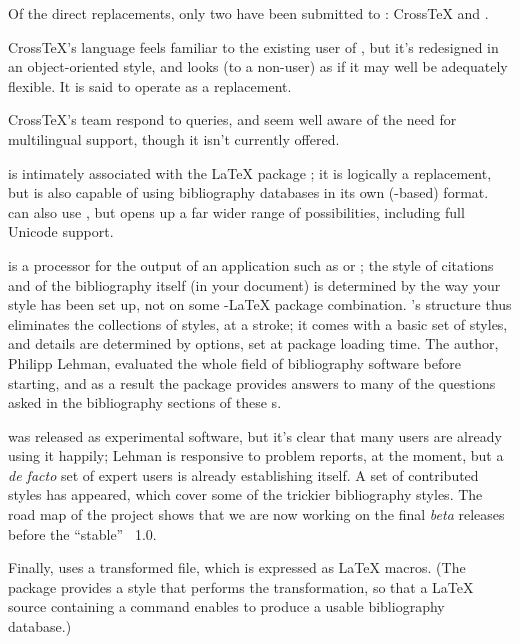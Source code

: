 Of the direct \BibTeX{} replacements, only two have been submitted to
: Cross\TeX{} and .

Cross\TeX{}'s language feels familiar to the existing user of
\BibTeX{}, but it's redesigned in an object-oriented style, and looks
(to a non-user) as if it may well be adequately flexible.  It is said
to operate as a \BibTeX{} replacement.

Cross\TeX{}'s team respond to queries, and seem well aware of the
need for multilingual support, though it isn't currently offered.

 is intimately associated with the \LaTeX{} package
; it is logically a \BibTeX{} replacement, but is also
capable of using bibliography databases in its own
 (-based) format.  
can also use \BibTeX{}, but  opens up a far wider
range of possibilities, including full Unicode support.

 is a processor for the output of an application
such as  or \BibTeX{}; the style of citations and of
the bibliography itself (in your document) is determined by the way
your  style has been set up, not on some
\BibTeX{}-\LaTeX{} package combination.  's
structure thus eliminates the collections of \BibTeX{} styles, at a
stroke; it comes with a basic set of styles, and details are
determined by options, set at package loading time.  The author,
Philipp Lehman, evaluated the whole field of bibliography software
before starting, and as a result the package provides answers to
many of the questions asked in the bibliography sections of these
s.

 was released as experimental software, but it's
clear that many users are already using it happily; Lehman is
responsive to problem reports, at the moment, but a \emph{de facto}
set of expert users is already establishing itself.  A set of
contributed styles has appeared, which cover some of the trickier
bibliography styles.  The road map of the project shows that we are
now working on the final \emph{beta} releases before the ``stable''
~1.0.

Finally,  uses a transformed  file,
which is expressed as \LaTeX{} macros.  (The package provides a
\BibTeX{} style that performs the transformation, so that a \LaTeX{}
source containing a  command enables \BibTeX{} to
produce a usable  bibliography database.)

